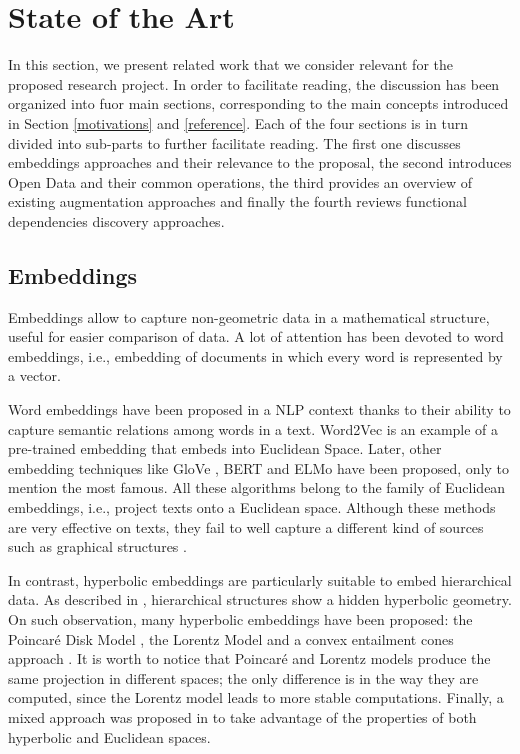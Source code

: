 \section{State of the Art}\label{related}
In this section, we present related work that we consider relevant for the proposed research project. In order to facilitate reading, the discussion has been organized into fuor main sections, corresponding to the main concepts introduced in Section \ref{motivations} and \ref{reference}. Each of the four sections is in turn divided into sub-parts to further facilitate reading. The first one discusses embeddings approaches and their relevance to the proposal, the second introduces Open Data and their common operations, the third provides an overview of existing augmentation approaches and finally the fourth reviews functional dependencies discovery approaches.

\subsection{Embeddings}
Embeddings allow to capture non-geometric data in a mathematical structure, useful for easier comparison of data. A lot of attention has been devoted to word embeddings, i.e., embedding of documents in which every word is represented by a vector. 

Word embeddings have been proposed in a NLP context thanks to their ability to capture semantic relations among words in a text. 
Word2Vec \cite{Mikolov2013EfficientEO} is an example of a pre-trained embedding that embeds into Euclidean Space. 
Later, other embedding techniques like GloVe \cite{pennington2014glove}, BERT \cite{devlin2018bert} and ELMo \cite{peters2018deep} have been proposed, only to mention the most famous. 
All these algorithms belong to the family of Euclidean embeddings, i.e., project texts onto a Euclidean space. 
Although these methods are very effective on texts, they fail to well capture a different kind of sources such as graphical structures \cite{NIPS2017_7213}. 

In contrast, hyperbolic embeddings are particularly suitable to embed hierarchical data. 
As described in \cite{krioukov2010hyperbolic}, hierarchical structures show a hidden hyperbolic geometry. 
On such observation, many hyperbolic embeddings have been proposed: the Poincar\'e Disk Model \cite{NIPS2017_7213}, the Lorentz Model \cite{DBLP:journals/corr/abs-1806-03417} and a convex entailment cones approach \cite{ganea2018hyperbolic}. 
It is worth to notice that Poincar\'e and Lorentz models produce the same projection in different spaces; the only difference is in the way they are computed, since the Lorentz model leads to more stable computations. 
Finally, a mixed approach was proposed in \cite{gu2018learning} to take advantage of the properties of both hyperbolic and Euclidean spaces. 

